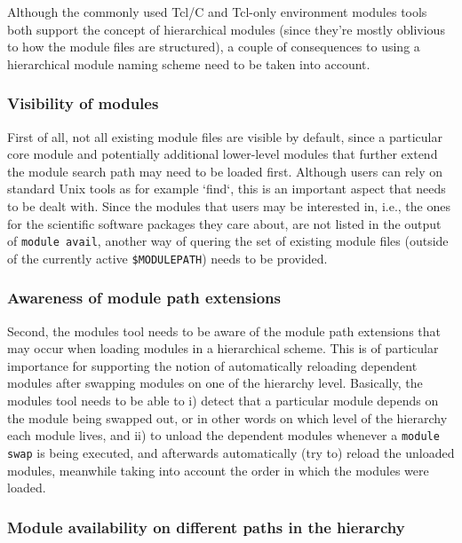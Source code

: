 Although the commonly used Tcl/C and Tcl-only environment modules tools
both support the concept of hierarchical modules (since they're mostly
oblivious to how the module files are structured), a couple of consequences
to using a hierarchical module naming scheme need to be taken into account.

\subsubsection{Visibility of modules}
\label{sec:hierarchical_consequences_visibility}

First of all, not all existing module files are visible by default, since
a particular core module and potentially additional lower-level modules
that further extend the module search path may need to be loaded first.
Although users can rely on standard Unix tools as for example `find`, this
is an important aspect that needs to be dealt with. Since the modules that
users may be interested in, i.e., the ones for the scientific software
packages they care about, are not listed in the output of \texttt{module
avail}, another way of quering the set of existing module files (outside
of the currently active \texttt{\$MODULEPATH}) needs to be
provided.

\subsubsection{Awareness of module path extensions}
\label{sec:hierarchical_consequences_extensions}

Second, the modules tool needs to be aware of the module path extensions that
may occur when loading modules in a hierarchical scheme. This is of
particular importance for supporting the notion of automatically reloading
dependent modules after swapping modules on one of the hierarchy level.
Basically, the modules tool needs to be able to i) detect that a particular
module depends on the module being swapped out, or in other words on which
level of the hierarchy each module lives, and ii) to unload the dependent
modules whenever a \texttt{module swap} is being executed, and afterwards
automatically (try to) reload the unloaded modules, meanwhile taking into
account the order in which the modules were loaded.

\subsubsection{Module availability on different paths in the hierarchy}
\label{sec:hierarchical_consequences_availability}

